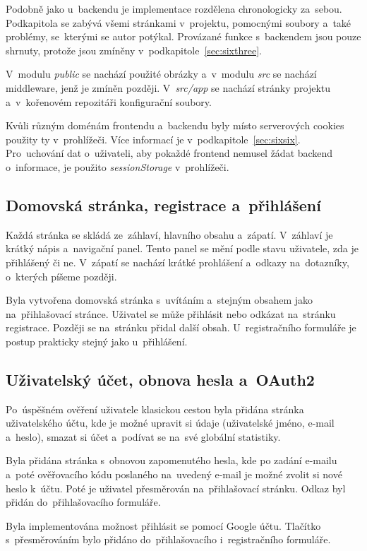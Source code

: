 \documentclass[twoside]{ctuthesis}
\begin{document}
Podobně jako u~backendu je implementace rozdělena chronologicky za~sebou. Podkapitola se zabývá všemi stránkami v~projektu, pomocnými soubory a~také problémy, se~kterými se autor potýkal. Provázané funkce s~backendem jsou pouze shrnuty, protože jsou zmíněny v~podkapitole~\ref{sec:sixthree}.

V~modulu \emph{public} se nachází použité obrázky a~v~modulu \emph{src} se nachází middleware, jenž je zmíněn později. V~\emph{src/app} se nachází stránky projektu a~v~kořenovém repozitáři konfigurační soubory.

Kvůli různým doménám frontendu a~backendu byly místo serverových cookies použity ty v~prohlížeči. Více informací je v~podkapitole~\ref{sec:sixsix}. Pro~uchování dat o~uživateli, aby pokaždé frontend nemusel žádat backend o~informace, je použito \emph{sessionStorage} v~prohlížeči.

\subsection{Domovská stránka, registrace a~přihlášení}

Každá stránka se skládá ze~záhlaví, hlavního obsahu a~zápatí. V~záhlaví je krátký nápis a~navigační panel. Tento panel se mění podle stavu uživatele, zda je přihlášený či ne. V~zápatí se nachází krátké prohlášení a~odkazy na~dotazníky, o~kterých píšeme později.

Byla vytvořena domovská stránka s~uvítáním a~stejným obsahem jako na~přihlašovací stránce. Uživatel se může přihlásit nebo odkázat na~stránku registrace. Později se na~stránku přidal další obsah. U~registračního formuláře je postup prakticky stejný jako u~přihlášení.

\subsection{Uživatelský účet, obnova hesla a~OAuth2}

Po~úspěšném ověření uživatele klasickou cestou byla přidána stránka uživatelského účtu, kde je možné upravit si údaje (uživatelské jméno, e-mail a~heslo), smazat si účet a~podívat se na~své globální statistiky.

Byla přidána stránka s~obnovou zapomenutého hesla, kde po zadání e-mailu a~poté ověřovacího kódu poslaného na~uvedený e-mail je možné zvolit si nové heslo k~účtu. Poté je uživatel přesměrován na~přihlašovací stránku. Odkaz byl přidán do~přihlašovacího formuláře.

Byla implementována možnost přihlásit se pomocí Google účtu. Tlačítko s~přesměrováním bylo přidáno do~přihlašovacího i~registračního formuláře.
\end{document}
